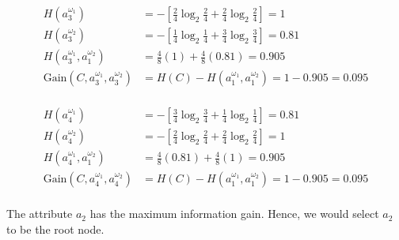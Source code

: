 \begin{align*}
	H(a_{3}^{\omega_{1}}) & =  - [\frac{2}{4}\log_{2}\frac{2}{4} + \frac{2}{4}\log_{2}\frac{2}{4}] = 1 \\ 
	H(a_{3}^{\omega_{2}}) & = - [\frac{1}{4}\log_{2}\frac{1}{4} + \frac{3}{4}\log_{2}\frac{3}{4}] = 0.81 \\		
	H(a_{3}^{\omega_{1}}, a_{1}^{\omega_{2}}) & = \frac{4}{8}(1) + \frac{4}{8}(0.81) = 0.905 \\
	\text{Gain}(C, a_{3}^{\omega_{1}}, a_{3}^{\omega_{2}}) & = H(C) - H(a_{1}^{\omega_{1}}, a_{1}^{\omega_{2}}) = 1 - 0.905 = 0.095 \\		
\end{align*}		

\begin{align*}
	H(a_{4}^{\omega_{1}}) & =  - [\frac{3}{4}\log_{2}\frac{3}{4} + \frac{1}{4}\log_{2}\frac{1}{4}] = 0.81 \\ 
	H(a_{4}^{\omega_{2}}) & = - [\frac{2}{4}\log_{2}\frac{2}{4} + \frac{2}{4}\log_{2}\frac{2}{4}] = 1 \\		
	H(a_{4}^{\omega_{1}}, a_{1}^{\omega_{2}}) & = \frac{4}{8}(0.81) + \frac{4}{8}(1) = 0.905 \\
	\text{Gain}(C, a_{4}^{\omega_{1}}, a_{4}^{\omega_{2}}) & = H(C) - H(a_{1}^{\omega_{1}}, a_{1}^{\omega_{2}}) = 1 - 0.905 = 0.095 \\		
\end{align*}		

The attribute $a_{2}$ has the maximum information gain. Hence, we would select $a_{2}$ to be the root node.
	
\newpage



